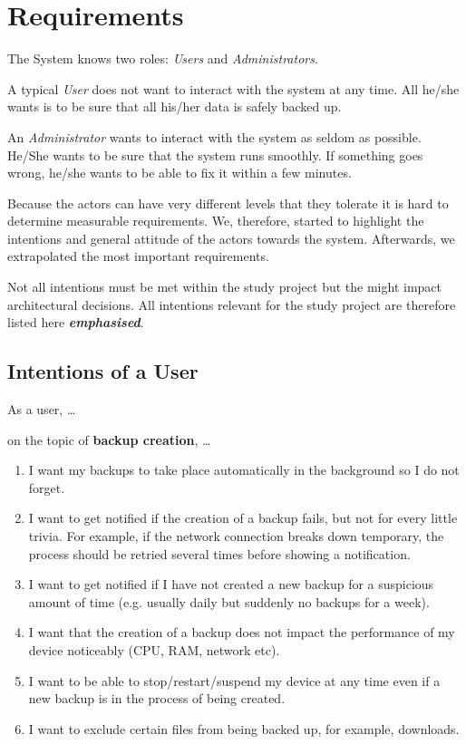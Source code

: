 \newcommand{\relevantreq}[1]{\textit{\textbf{#1}}}
\newcommand{\enumcountsave}{\setcounter{listcounter}{\value{enumi}}}
\newcommand{\enumcountrestore}{\setcounter{enumi}{\value{listcounter}}}

\section{Requirements}
\label{requirements}
The System knows two roles: \emph{Users} and \emph{Administrators}.

A typical \emph{User} does not want to interact with the system at any time.
All he/she wants is to be sure that all his/her data is safely backed
up.

An \emph{Administrator} wants to interact with the system as seldom as possible.
He/She wants to be sure that the system runs smoothly. If something goes
wrong, he/she wants to be able to fix it within a few minutes.

Because the actors can have very different levels that they tolerate it is hard to
determine measurable requirements. We, therefore, started to highlight the intentions
and general attitude of the actors towards the system. Afterwards, we extrapolated the most
important requirements.

Not all intentions must be met within the study project but the might impact architectural decisions. All intentions relevant for the study project are therefore listed here \relevantreq{emphasised}.


\subsection{Intentions of a User}
As a user, \ldots{}

\begin{flushright}
on the topic of \textbf{backup creation}, \ldots{}
\end{flushright}

\begin{enumerate}
	\item	I want my backups to take place automatically in the background so I do not forget.
	\item	I want to get notified if the creation of a backup fails, but not for every little trivia. For example, if the network connection breaks down temporary, the process should be retried several times before showing a notification.
	\item	I want to get notified if I have not created a new backup for a suspicious amount of time (e.g. usually daily but suddenly no backups for a week).
	\item	I want that the creation of a backup does not impact the performance of my device noticeably (CPU, RAM, network etc).
	\item	I want to be able to stop/restart/suspend my device at any time even if a new backup is in the process of being created.
	\item	I want to exclude certain files from being backed up, for example, downloads.
	\enumcountsave
\end{enumerate}

